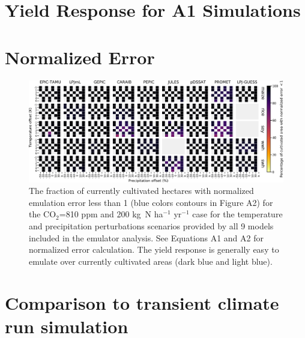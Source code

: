 \documentclass[10pt]{article}
\begin{document}
\clearpage
\section{Yield Response for A1 Simulations}




\clearpage
\section{Normalized Error}

\begin{figure}[h!]
\centering
\includegraphics[width=15.5cm]{error_grid_810.png}
\caption{
The fraction of currently cultivated hectares with normalized emulation error less than 1 (blue colors contours in Figure A2) for the CO$_2$=810 ppm and 200 kg~N ha$^{-1}$ yr$^{-1}$ case for the temperature and precipitation perturbations scenarios provided by all 9 models included in the emulator analysis. 
See Equations A1 and A2 for normalized error calculation. 
The yield response is generally easy to emulate over currently cultivated areas (dark blue and light blue).
}
\label{fig:error810}
\end{figure}

\clearpage
\section{Comparison to transient climate run simulation}
\end{document}
